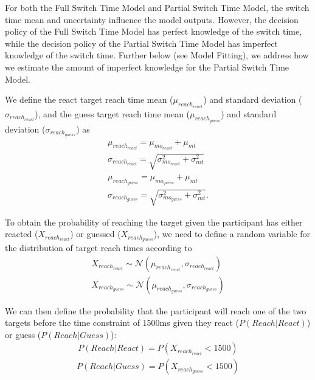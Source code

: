 \documentclass[man,floatsintext,letterpaper,12pt]{apa7}
\begin{document}
For both the Full Switch Time Model and Partial Switch Time Model, the switch time mean and uncertainty influence the model outputs. However, the decision policy of the Full Switch Time Model has perfect knowledge of the switch time, while the decision policy of the Partial Switch Time Model has imperfect knowledge of the switch time. Further below (see Model Fitting), we address how we estimate the amount of imperfect knowledge for the Partial Switch Time Model.

We define the react target reach time mean ($\mu_{reach_{react}}$) and standard deviation ($\sigma_{reach_{react}}$), and the  guess target reach time mean ($\mu_{reach_{guess}}$) and standard deviation ($\sigma_{reach_{guess}}$) as
\begin{align}
    \mu_{reach_{react}} =\mu_{mo_{react}} + \mu_{mt}                      \\
    \sigma_{reach_{react}} = \sqrt{\sigma_{mo_{react}}^2 + \sigma_{mt}^2} \\
    \mu_{reach_{guess}} =\mu_{mo_{guess}} + \mu_{mt}                      \\
    \sigma_{reach_{guess}} = \sqrt{\sigma_{mo_{guess}}^2 + \sigma_{mt}^2}.
\end{align}

To obtain the probability of reaching the target given the participant has either reacted ($X_{reach_{react}}$) or guessed ($X_{reach_{guess}}$), we need to define a random variable for the distribution of target reach times according to
\begin{align}
    X_{reach_{react}} \sim \mathcal{N}(\mu_{reach_{react}}, \sigma_{reach_{react}}) \\
    X_{reach_{guess}} \sim \mathcal{N}(\mu_{reach_{guess}}, \sigma_{reach_{guess}})
\end{align}

We can then define the probability that the participant will reach one of the two targets before the time constraint of 1500ms given they react ($P(Reach|React)$) or guess ($P(Reach|Guess)$):
\begin{align}
    P(Reach|React) = P(X_{reach_{react}} < 1500)
\end{align}
\begin{align}
    P(Reach|Guess) = P(X_{reach_{guess}} < 1500)
\end{align}
\end{document}
